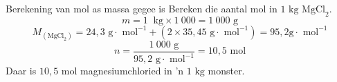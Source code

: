             \label{m38717*secfhsst!!!underscore!!!id641} 
      \begin{wex}{Berekening van mol as massa gegee is}
{
Bereken die aantal mol in $1\text{ kg}$ $\text{MgCl}_{2}$.
     }
{
\label{m38717*id278854}\nopagebreak\noindent{}
    \begin{equation*}
    m = 1~\text{ kg} \times 1 ~000=1 ~000\text{ g}
      \end{equation*}
\label{m38717*id278912}\nopagebreak\noindent{}
    \begin{equation*}
    {M}_{(\text{MgCl}_{2})} = 24,3 \text{ g} \cdot \text{ mol}^{-1} + (2 \times 35,45 \text{ g} \cdot \text{ mol}^{-1}) = 95,2 \text{g} \cdot \text{ mol}^{-1}
      \end{equation*}    
      \label{m38717*id279005}\nopagebreak\noindent{}
    \begin{equation*}
    n=\frac{1~000 \text{ g}}{95,2 \text{ g} \cdot \text{ mol}^{-1}} = 10,5 \text{ mol}
      \end{equation*}
      \label{m38717*id279046}Daar is $10,5 \text{ mol}$ magnesiumchloried in 'n $1 \text{ kg}$ monster.
}
    \end{wex}
\label{m38717*secfhsst!!!underscore!!!id832}
